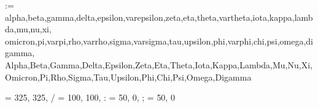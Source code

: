 \newcommand{\savesffamily}{\sfdefault}
\makeatletter
\newcommand{\savesfmdseries}{\mdseries@sf}
\newcommand{\savesfbfseries}{\bfseries@sf}
\makeatother

\usepackage[textmd, semibold, scale=0.91]{plex-serif}
\let \savermfamily \rmdefault
\makeatletter
\newcommand{\savermmdseries}{\mdseries@rm}
\newcommand{\savermbfseries}{\bfseries@rm}
\makeatother

\makeatletter
\@for\@tempa:=%
	alpha,beta,gamma,delta,epsilon,varepsilon,zeta,eta,theta,vartheta,iota,kappa,lambda,mu,nu,xi,%
	omicron,pi,varpi,rho,varrho,sigma,varsigma,tau,upsilon,phi,varphi,chi,psi,omega,digamma,%
	Alpha,Beta,Gamma,Delta,Epsilon,Zeta,Eta,Theta,Iota,Kappa,Lambda,Mu,Nu,Xi,%
	Omicron,Pi,Rho,Sigma,Tau,Upsilon,Phi,Chi,Psi,Omega,Digamma%
\do{%
	\expandafter\let\csname up\@tempa\expandafter\endcsname\csname\@tempa up\endcsname%
}%
\makeatother

\ifx\nequiv\undefined
	\newcommand{\nequiv}{\not\equiv}
\fi

\let \savermdefaultfortext \rmdefault
\let \savemddefaultfortext \mddefault
\let \savebfdefaultfortext \bfdefault
\renewcommand{\textellipsis}{\mbox{.{\kern.09em}.{\kern.09em}.}}

\ifxetex
\else
		{\textemdash = {325, 325},
			/ = {100, 100},
			: = { 50,   0},
			; = { 50,   0}}
\fi

\usepackage{xfrac}	%

\AtBeginDocument{%
	\providecommand{\euro}[1]{%
		\relax\ifmmode\text{\texteuro}#1\else\texteuro #1\fi%
	}%
}
